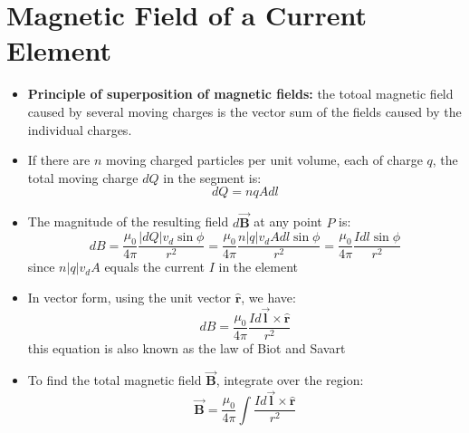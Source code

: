\documentclass[11pt, a4paper]{article}
\begin{document}
\section[28.2, Magnetic Field of a Current Element]{Magnetic Field of a Current Element}
\begin{itemize}
    \item \textbf{Principle of superposition of magnetic fields:} the totoal magnetic
        field caused by several moving charges is the vector sum of the fields caused by
        the individual charges.
    \item If there are $n$ moving charged particles per unit volume, each of charge $q$,
        the total moving charge $dQ$ in the segment is:
        \begin{equation}
            dQ = nqAdl
        \end{equation}
    \item The magnitude of the resulting field $d\vec{\mathbf{B}}$ at any point $P$ is:
        \begin{equation}
            dB = \frac{\mu_0}{4\pi}\frac{|dQ|v_d\sin\phi}{r^2} =
            \frac{\mu_0}{4\pi}\frac{n|q|v_d Adl\sin\phi}{r^2} =
            \frac{\mu_0}{4\pi}\frac{Idl\sin\phi}{r^2}
        \end{equation}
        since $n|q|v_d A$ equals the current $I$ in the element
    \item In vector form, using the unit vector $\mathbf{\hat{r}}$, we have:
        \begin{equation}
            dB = \frac{\mu_0}{4\pi}\frac{Id\vec{\mathbf{l}} \times \mathbf{\hat{r}}}{r^2}
        \end{equation}
        this equation is also known as the law of Biot and Savart
    \item To find the total magnetic field $\vec{\mathbf{B}}$, integrate over the region:
        \begin{equation}
            \vec{\mathbf{B}} = \frac{\mu_0}{4\pi} \int 
            \frac{Id\vec{\mathbf{l}} \times \mathbf{\hat{r}}}{r^2}
        \end{equation}
\end{itemize}
\end{document}
